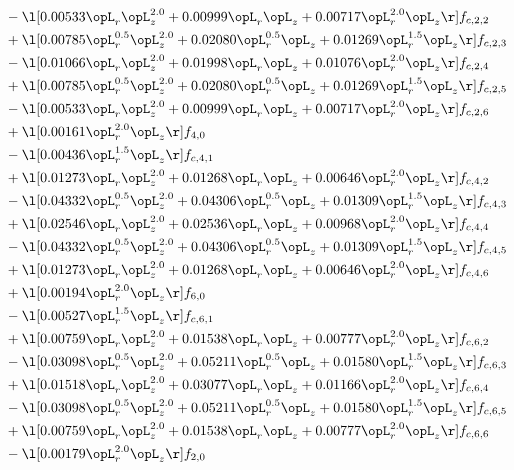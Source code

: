 \begin{alignat}{2}
& - \l[  0.00533 \opL_r \opL_z^{2.0} +  0.00999 \opL_r \opL_z +  0.00717 \opL_r^{2.0} \opL_z  \r] f_{c,2,2} \nonumber \\ 
& + \l[  0.00785 \opL_r^{0.5} \opL_z^{2.0} +  0.02080 \opL_r^{0.5} \opL_z +  0.01269 \opL_r^{1.5} \opL_z  \r] f_{c,2,3} \nonumber \\ 
& - \l[  0.01066 \opL_r \opL_z^{2.0} +  0.01998 \opL_r \opL_z +  0.01076 \opL_r^{2.0} \opL_z  \r] f_{c,2,4} \nonumber \\ 
& + \l[  0.00785 \opL_r^{0.5} \opL_z^{2.0} +  0.02080 \opL_r^{0.5} \opL_z +  0.01269 \opL_r^{1.5} \opL_z  \r] f_{c,2,5} \nonumber \\ 
& - \l[  0.00533 \opL_r \opL_z^{2.0} +  0.00999 \opL_r \opL_z +  0.00717 \opL_r^{2.0} \opL_z  \r] f_{c,2,6} \nonumber \\ 
& + \l[  0.00161 \opL_r^{2.0} \opL_z  \r] f_{4,0} \nonumber \\ 
& - \l[  0.00436 \opL_r^{1.5} \opL_z  \r] f_{c,4,1} \nonumber \\ 
& + \l[  0.01273 \opL_r \opL_z^{2.0} +  0.01268 \opL_r \opL_z +  0.00646 \opL_r^{2.0} \opL_z  \r] f_{c,4,2} \nonumber \\ 
& - \l[  0.04332 \opL_r^{0.5} \opL_z^{2.0} +  0.04306 \opL_r^{0.5} \opL_z +  0.01309 \opL_r^{1.5} \opL_z  \r] f_{c,4,3} \nonumber \\ 
& + \l[  0.02546 \opL_r \opL_z^{2.0} +  0.02536 \opL_r \opL_z +  0.00968 \opL_r^{2.0} \opL_z  \r] f_{c,4,4} \nonumber \\ 
& - \l[  0.04332 \opL_r^{0.5} \opL_z^{2.0} +  0.04306 \opL_r^{0.5} \opL_z +  0.01309 \opL_r^{1.5} \opL_z  \r] f_{c,4,5} \nonumber \\ 
& + \l[  0.01273 \opL_r \opL_z^{2.0} +  0.01268 \opL_r \opL_z +  0.00646 \opL_r^{2.0} \opL_z  \r] f_{c,4,6} \nonumber \\ 
& + \l[  0.00194 \opL_r^{2.0} \opL_z  \r] f_{6,0} \nonumber \\ 
& - \l[  0.00527 \opL_r^{1.5} \opL_z  \r] f_{c,6,1} \nonumber \\ 
& + \l[  0.00759 \opL_r \opL_z^{2.0} +  0.01538 \opL_r \opL_z +  0.00777 \opL_r^{2.0} \opL_z  \r] f_{c,6,2} \nonumber \\ 
& - \l[  0.03098 \opL_r^{0.5} \opL_z^{2.0} +  0.05211 \opL_r^{0.5} \opL_z +  0.01580 \opL_r^{1.5} \opL_z  \r] f_{c,6,3} \nonumber \\ 
& + \l[  0.01518 \opL_r \opL_z^{2.0} +  0.03077 \opL_r \opL_z +  0.01166 \opL_r^{2.0} \opL_z  \r] f_{c,6,4} \nonumber \\ 
& - \l[  0.03098 \opL_r^{0.5} \opL_z^{2.0} +  0.05211 \opL_r^{0.5} \opL_z +  0.01580 \opL_r^{1.5} \opL_z  \r] f_{c,6,5} \nonumber \\ 
& + \l[  0.00759 \opL_r \opL_z^{2.0} +  0.01538 \opL_r \opL_z +  0.00777 \opL_r^{2.0} \opL_z  \r] f_{c,6,6} \nonumber \\ 
& - \l[  0.00179 \opL_r^{2.0} \opL_z  \r] f_{2,0} \nonumber \\ 
\end{alignat} 


